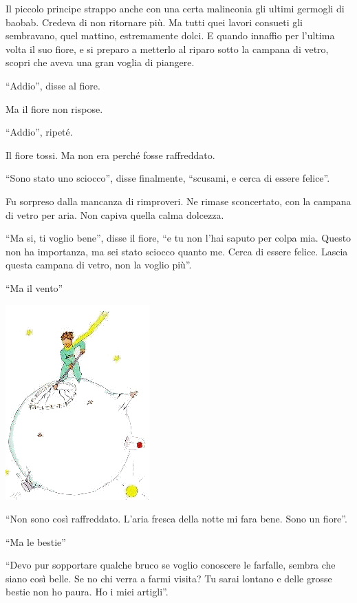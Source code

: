 \documentclass[11pt]{scrbook}
\begin{document}
Il piccolo principe strappo anche con una certa malinconia gli ultimi
germogli di baobab. Credeva di non ritornare più. Ma tutti quei lavori
consueti gli sembravano, quel mattino, estremamente dolci. E quando
innaffio per l'ultima volta il suo fiore, e si preparo a metterlo al
riparo sotto la campana di vetro, scopri che aveva una gran voglia di
piangere.

``Addio'', disse al fiore.

Ma il fiore non rispose.

``Addio'', ripeté.

Il fiore tossi. Ma non era perché fosse raffreddato.

``Sono stato uno sciocco'', disse finalmente, ``scusami, e cerca di
essere felice''.

Fu sorpreso dalla mancanza di rimproveri. Ne rimase sconcertato, con la
campana di vetro per aria. Non capiva quella calma dolcezza.

``Ma si, ti voglio bene'', disse il fiore, ``e tu non l'hai saputo per
colpa mia. Questo non ha importanza, ma sei stato sciocco quanto me.
Cerca di essere felice. Lascia questa campana di vetro, non la voglio
più''.

``Ma il vento''

\begin{center}
\includegraphics{img/9a}
\end{center}

``Non sono così raffreddato. L'aria fresca della notte mi fara bene.
Sono un fiore''.

``Ma le bestie''

``Devo pur sopportare qualche bruco se voglio conoscere le farfalle,
sembra che siano così belle. Se no chi verra a farmi visita? Tu sarai
lontano e delle grosse bestie non ho paura. Ho i miei artigli''.
\end{document}
